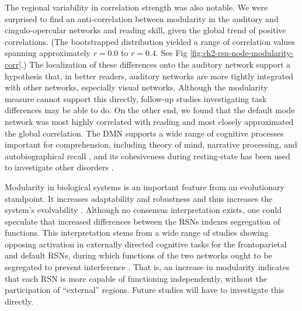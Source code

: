 The regional variability in correlation strength was also notable. We were surprised to find an anti-correlation between modularity in the auditory and cingulo-opercular networks and reading skill, given the global trend of positive correlations. (The bootstrapped distribution yielded a range of correlation values spanning approximately $r = 0.0$ to $r = 0.4$. See Fig \ref{fig:ch2-rsn-node-modularity-corr}.) The localization of these differences onto the auditory network support a hypothesis that, in better readers, auditory networks are more tightly integrated with other networks, especially visual networks. Although the modularity measure cannot support this directly, follow-up studies investigating task differences may be able to do. On the other end, we found that the default mode network was most highly correlated with reading and most closely approximated the global correlation. The DMN supports a wide range of cognitive processes important for comprehension, including theory of mind, narrative processing, and autobiographical recall \citep{Buckner2008, AbdulSabur2014}, and its cohesiveness during resting-state has been used to investigate other disorders \citep{Uddin2008}. 

Modularity in biological systems is an important feature from an evolutionary standpoint. It increases adaptability and robustness and thus increases the system's evolvability \citep{Sporns2016}. Although no consensus interpretation exists, one could speculate that increased differences between the RSNs indexes segregation of functions. This interpretation stems from a wide range of studies showing opposing activation in externally directed cognitive tasks for the frontoparietal and default RSNs, during which functions of the two networks ought to be segregated to prevent interference \citep{Reineberg2018}. That is, an increase in modularity indicates that each RSN is more capable of functioning independently, without the participation of ``external'' regions. Future studies will have to investigate this directly.

